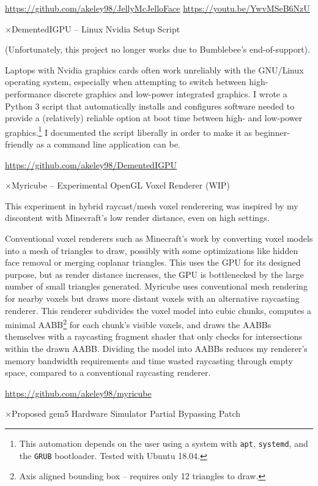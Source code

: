 \documentclass[11pt]{article}
\newcommand{\web}[1]{{ \color{webColor} \small \url{#1}}}
\newcommand{\mySub}[1]{{\color{subColor}$\times$\hspace{1mm}\textsf{#1}}}
\begin{document}
\web{https://github.com/akeley98/JellyMcJelloFace}
\hfill\web{https://youtu.be/YwvMSeB6NzU}

\mySub{DementedIGPU -- Linux Nvidia Setup Script}

(Unfortunately, this project no longer works due to Bumblebee's
end-of-support).

Laptops with Nvidia graphics cards often work unreliably with the
GNU/Linux operating system, especially when attempting to switch
between high-performance discrete graphics and low-power integrated
graphics. I wrote a Python 3 script that automatically installs and
configures software needed to provide a (relatively) reliable option
at boot time between high- and low-power graphics.\footnote{This
  automation depends on the user using a system with \texttt{apt},
  \texttt{systemd}, and the \texttt{GRUB} bootloader. Tested with
  Ubuntu 18.04.} I documented the script liberally in order to make it
as beginner-friendly as a command line application can be.

\web{https://github.com/akeley98/DementedIGPU}

\mySub{Myricube -- Experimental OpenGL Voxel Renderer (WIP)}

This experiment in hybrid raycast/mesh voxel renderering was inspired
by my discontent with Minecraft's low render distance, even on high
settings.

Conventional voxel renderers such as Minecraft's work by converting
voxel models into a mesh of triangles to draw, possibly with some
optimizations like hidden face removal or merging coplanar
triangles. This uses the GPU for its designed purpose, but as render
distance increases, the GPU is bottlenecked by the large number of
small triangles generated. Myricube uses conventional mesh rendering
for nearby voxels but draws more distant voxels with an alternative
raycasting renderer. This renderer subdivides the voxel model into
cubic chunks, computes a minimal AABB\footnote{Axis aligned bounding
  box -- requires only 12 triangles to draw.} for each chunk's visible
voxels, and draws the AABBs themselves with a raycasting fragment
shader that only checks for intersections within the drawn AABB.
Dividing the model into AABBs reduces my renderer's memory bandwidth
requirements and time wasted raycasting through empty space, compared
to a conventional raycasting renderer.

\web{https://github.com/akeley98/myricube}

\mySub{Proposed gem5 Hardware Simulator Partial Bypassing Patch}
\end{document}
